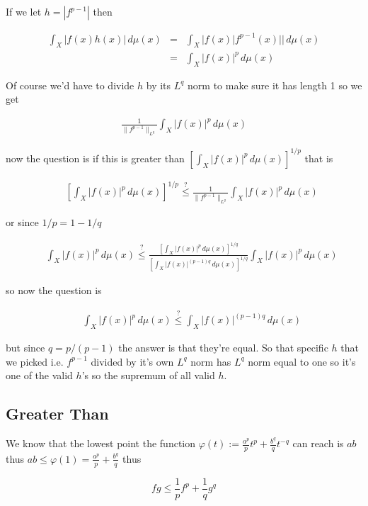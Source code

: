 \documentclass[oneside]{book}
\begin{document}
If we let $h=|f^{p-1}|$ then

\begin{eqnarray}
\int_X |f(x)h(x)| \, d\mu(x) &=& \int_X |f(x) |f^{p-1}(x)| |\, d\mu(x)\nonumber \\
&=&\int_X |f(x)|^p \, d\mu(x)
\end{eqnarray}

Of course we'd have to divide $h$ by its $L^q$ norm to make sure it has length 1 so we get 

\begin{eqnarray}
\frac{1}{\| f^{p-1} \|_{L^q}} \int_X |f(x)|^p \, d\mu(x)
\end{eqnarray}

now the question is if this is greater than $\left[ \int_X |f(x)|^p \, d\mu(x) \right]^{1/p} $ that is

\begin{eqnarray}
&&\left[ \int_X |f(x)|^p \, d\mu(x) \right]^{1/p} \stackrel{?}{\le} \frac{1}{\| f^{p-1} \|_{L^q}} \int_X |f(x)|^p \, d\mu(x)
\end{eqnarray}

or since $1/p=1-1/q$

\begin{eqnarray}
&& \int_X |f(x)|^p \, d\mu(x)  \stackrel{?}{\le}  \frac{\left[ \int_X |f(x)|^p \, d\mu(x) \right]^{1/q}}{ \left[ \int_X |f(x)|^{(p-1)q} \, d\mu(x) \right]^{1/q} } \int_X |f(x)|^p \, d\mu(x)
\end{eqnarray}

so now the question is 

\begin{eqnarray}
&&\int_X |f(x)|^p \, d\mu(x)  \stackrel{?}{\le}   \int_X |f(x)|^{(p-1)q} \, d\mu(x)
\end{eqnarray}

but since $q=p/(p-1)$ the answer is that they're equal. So that specific $h$ that we picked i.e. $f^{p-1}$ divided by it's own $L^q$ norm has $L^q$ norm equal to one so it's one of the valid $h$'s so the supremum of all valid $h$.

\subsection{Greater Than}
We know that the lowest point the function $\varphi(t) := \frac{a^p}{p} t^p + \frac{b^q}{q} t^{-q}$ can reach is $ab$ thus $ab \le \varphi(1)=\frac{a^p}{p} + \frac{b^q}{q}$ thus

\begin{equation}
fg \le \frac{1}{p} f^p + \frac{1}{q} g^q
\end{equation}
\end{document}
